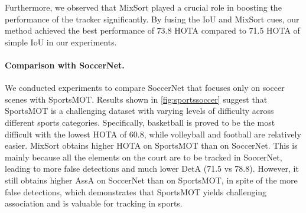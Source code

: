 \documentclass[10pt,twocolumn,letterpaper]{article}
\begin{document}
{Furthermore, we observed that MixSort played a crucial role in boosting the performance of the tracker significantly. By fusing the IoU and MixSort cues, our method achieved the best performance of 73.8 HOTA compared to 71.5 HOTA of simple IoU in our experiments.

\vspace{-4mm}
\paragraph{Comparison with SoccerNet.}
We conducted experiments to compare SoccerNet that focuses only on soccer scenes with SportsMOT. Results shown in \cref{fig:sportssoccer} suggest that SportsMOT is a challenging dataset with varying levels of difficulty across different sports categories. Specifically, basketball is proved to be the most difficult with the lowest HOTA of 60.8, while volleyball and football are relatively easier. 
MixSort obtains higher HOTA on SportsMOT than on SoccerNet. This is mainly because all the elements on the court are to be tracked in SoccerNet, leading to more false detections and much lower DetA (71.5 vs 78.8). However, it still obtains higher AssA on SoccerNet than on SportsMOT, in spite of the more false detections, which demonstrates that SportsMOT yields challenging association and is valuable for tracking in sports.
\begin{table}[pt]
\vspace{-3mm}
\caption{Results of MixSort-Byte on SportsMOT and SoccerNet test set. The models are trained on SportsMOT training and validation set and SoccerNet training set respectively and the hyper-parameters are the same. }
\label{fig:sportssoccer}
\end{table}

}
\end{document}
